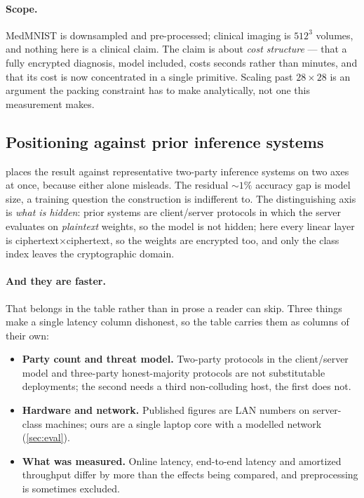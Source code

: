\documentclass[11pt]{article}
\theoremstyle{plain}
\theoremstyle{definition}
\theoremstyle{remark}
\begin{document}
\paragraph{Scope.} MedMNIST is downsampled and pre-processed; clinical
imaging is $512^3$ volumes, and nothing here is a clinical claim. The claim
is about \emph{cost structure} --- that a fully encrypted diagnosis, model
included, costs seconds rather than minutes, and that its cost is now
concentrated in a single primitive. Scaling past $28\times28$ is an argument
the packing constraint has to make analytically, not one this measurement
makes.

\subsection{Positioning against prior inference systems}

 places the result against representative two-party inference
systems on two axes at once, because either alone misleads. The residual
${\sim}1\%$ accuracy gap is model size, a training question the construction is
indifferent to. The distinguishing axis is \emph{what is hidden}: prior systems
are client/server protocols in which the server evaluates on \emph{plaintext}
weights, so the model is not hidden; here every linear layer is
ciphertext$\times$ciphertext, so the weights are encrypted too, and only the class
index leaves the cryptographic domain.

\paragraph{And they are faster.} That belongs in the table rather than in prose a
reader can skip. Three things make a single latency column dishonest, so the table
carries them as columns of their own:

\begin{itemize}
  \item \textbf{Party count and threat model.} Two-party protocols in the
    client/server model and three-party honest-majority protocols are not
    substitutable deployments; the second needs a third
    non-colluding host, the first does not.
  \item \textbf{Hardware and network.} Published figures are LAN numbers on
    server-class machines; ours are a single laptop core with a modelled network
    (\cref{sec:eval}).
  \item \textbf{What was measured.} Online latency, end-to-end latency and
    amortized throughput differ by more than the effects being compared, and
    preprocessing is sometimes excluded.
\end{itemize}
\end{document}

